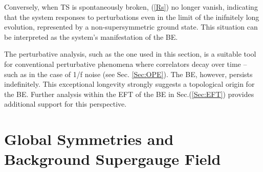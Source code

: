 \documentclass[final,5p,10pt,times,twocolumn,year]{elsarticle}
\begin{document}
Conversely, when TS is spontaneously broken, (\ref{Rs}) no longer vanish, indicating that the system responses to perturbations even in the limit of the inifnitely long evolution, represented by a non-supersymmetric ground state. This situation can be interpreted as the system's manifestation of the BE.

The perturbative analysis, such as the one used in this section, is a suitable tool for conventional perturbative phenomena where correlators decay over time -- such as in the case of 1/f noise (see Sec. \ref{Sec:OPE}). The BE, however, persists indefinitely. This exceptional longevity strongly suggests a topological origin for the BE. Further analysis within the EFT of the BE in Sec.(\ref{Sec:EFT}) provides additional support for this perspective.

\section{Global Symmetries and Background Supergauge Field}\label{Symmetries}
\end{document}
